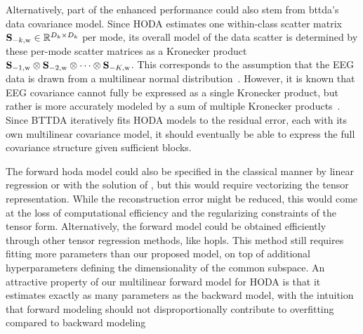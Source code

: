 \documentclass[twocolumn]{article}
\begin{document}
	Alternatively, part of the enhanced performance could also stem from \ac{bttda}'s
	data covariance model.
	Since HODA estimates one within-class scatter matrix
$\mathbf{S}_{-k,\text{w}}\in\mathbb{R}^{D_k\times D_k}$ per mode, its overall
	model of the data scatter is determined by these per-mode scatter matrices as a
	Kronecker product $\mathbf{S}_{-1,\text{w}}\otimes \mathbf{S}_{-2,\text{w}}\otimes\cdots\otimes \mathbf{S}_{-K,\text{w}}$.
	This corresponds to the assumption that the EEG data is
	drawn from a multilinear normal distribution~\cite{Ohlson2013}.
	However, it is known that EEG covariance cannot fully be expressed as a
	single Kronecker product, but rather is more accurately modeled by a sum of
	multiple Kronecker products~\cite{Bijma2005, Sosulski2022}.
	Since BTTDA iteratively fits HODA models to the residual error, each with its own
	multilinear covariance model, it should eventually be able to express the full
	covariance structure given sufficient blocks.

	The forward \ac{hoda} model could also be specified in the
	classical manner by linear regression or with the solution of \textcite{Haufe2014}, but this would require
	vectorizing the tensor representation.
	While the reconstruction error might be reduced, this would come at the loss of computational
	efficiency and the regularizing constraints of the tensor form.
	Alternatively, the forward model could be obtained efficiently through other tensor
	regression methods, like \ac{hopls}. This method still requires fitting more parameters than our
	proposed model, on top of additional hyperparameters defining the
	dimensionality of the common subspace.
	An attractive property of our multilinear forward model for HODA is that it
	estimates exactly as many parameters as the backward model, with the intuition that
	forward modeling should not disproportionally contribute to overfitting compared
	to backward modeling
\end{document}
